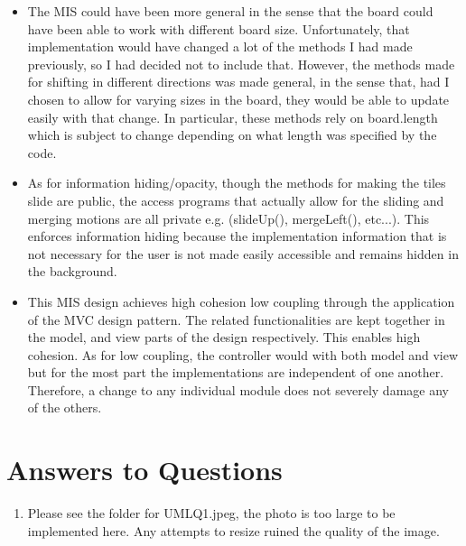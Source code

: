 \documentclass[12pt]{article}
\begin{document}
\begin {itemize}
        \begin{itemize} %
            \item  slideUp(), slideLeft(), slideDown(), slideRight()
            \item  mergeUp(), mergeLeft(), mergeDown(), mergeRight()
            \item  printBoard(), printScore()...
        \end{itemize}
    \item The MIS could have been more general in the sense that the board could have been able to work with different board size. Unfortunately, that implementation would have changed a lot of the methods I had made previously, so I had decided not to include that. However, the methods made for shifting in different directions was made general, in the sense that, had I chosen to allow for varying sizes in the board, they would be able to update easily with that change. In particular, these methods rely on board.length which is subject to change depending on what length was specified by the code.
    \item As for information hiding/opacity, though the methods for making the tiles slide are public, the access programs that actually allow for the sliding and merging motions are all private e.g. (slideUp(), mergeLeft(), etc...). This enforces information hiding because the implementation information that is not necessary for the user is not made easily accessible and remains hidden in the background.
    \item This MIS design achieves high cohesion low coupling  through the application of the MVC design pattern. The related functionalities are kept together in the model, and view parts of the design respectively. This enables high cohesion. As for low coupling, the controller would  with both model and view but for the most part the implementations are independent of one another. Therefore, a change to any individual module does not severely damage any of the others.
\end{itemize}

\newpage

\section* {Answers to Questions}
\begin{enumerate}
\item Please see the folder for UMLQ1.jpeg, the photo is too large to be implemented here. Any attempts to resize ruined the quality of the image.
\end{enumerate}

\end{document}
